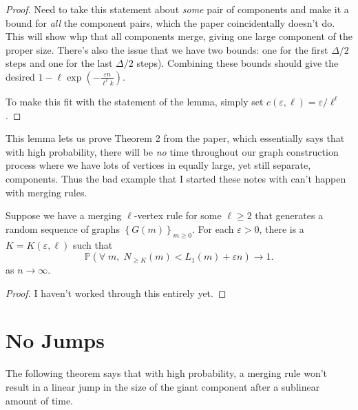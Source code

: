 \documentclass[twoside,10pt]{report}
\begin{document}
\begin{proof}
	{\color{red}Need to take this statement about \textit{some} pair of components and make it a bound for \textit{all} the component pairs, which the paper coincidentally doesn't do. This will show whp that all components merge, giving one large component of the proper size. There's also the issue that we have two bounds: one for the first $\Delta/2$ steps and one for the last $\Delta/2$ steps). Combining these bounds should give the desired $1-\ell \exp\left( -\frac{\varepsilon n}{\ell^{\ell}k}  \right)$.}

		To make this fit with the statement of the lemma, simply set $c(\varepsilon,\ell) = \varepsilon/\ell^{\ell}$.
\end{proof}

This lemma lets us prove Theorem 2 from the paper, which essentially says that with high probability, there will be \textit{no} time throughout our graph construction process where we have lots of vertices in equally large, yet still separate, components. Thus the bad example that I started these notes with can't happen with merging rules.

\setcounter{thrm}{1}
\begin{thrm}[]
	Suppose we have a merging $\ell$-vertex rule for some $\ell \geq 2$ that generates a random sequence of graphs $\left\{ G(m) \right\}_{m \geq 0}$. For each $\varepsilon > 0$, there is a $K = K(\varepsilon,\ell)$ such that
	\[
		\mathbb{P}(\forall\; m,\; N_{\geq K}(m) < L_1(m) + \varepsilon n) \to 1.
	\] as $n\to \infty$.
\end{thrm}
\begin{proof}
	{\color{red}I haven't worked through this entirely yet.}
\end{proof}


\section{No Jumps}

The following theorem says that with high probability, a merging rule won't result in a linear jump in the size of the giant component after a sublinear amount of time.
\end{document}
